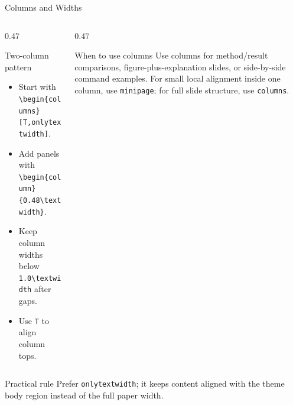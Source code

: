 \documentclass[aspectratio=169,10pt]{beamer}
\begin{document}
\begin{academicframe}{Columns and Widths}
  \begin{columns}[T,onlytextwidth]
    \begin{column}{0.47\textwidth}
      \begin{block}{Two-column pattern}
        \scriptsize
        \begin{itemize}
          \item Start with \texttt{\textbackslash begin\{columns\}[T,onlytextwidth]}.
          \item Add panels with \texttt{\textbackslash begin\{column\}\{0.48\textbackslash textwidth\}}.
          \item Keep column widths below \texttt{1.0\textbackslash textwidth} after gaps.
          \item Use \texttt{T} to align column tops.
        \end{itemize}
      \end{block}
    \end{column}
    \begin{column}{0.47\textwidth}
      \begin{exampleblock}{When to use columns}
        \scriptsize
        Use columns for method/result comparisons, figure-plus-explanation
        slides, or side-by-side command examples. For small local alignment
        inside one column, use \texttt{minipage}; for full slide structure, use
        \texttt{columns}.
      \end{exampleblock}
    \end{column}
  \end{columns}

  \vspace{0.5em}
  \begin{alertblock}{Practical rule}
    \scriptsize
    Prefer \texttt{onlytextwidth}; it keeps content aligned with the theme body
    region instead of the full paper width.
  \end{alertblock}
\end{academicframe}
\end{document}
